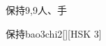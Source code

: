 \begin{entry}{保持}{9,9}{⼈、⼿}
  \begin{phonetics}{保持}{bao3chi2}[][HSK 3]
  \end{phonetics}
\end{entry}
